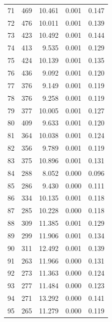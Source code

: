 \begin{table}
\begin{tabular}{rrrrr}
  71 &    469 &         10.461 &        0.001 &           0.147 \\
  72 &    476 &         10.011 &        0.001 &           0.139 \\
  73 &    423 &         10.492 &        0.001 &           0.144 \\
  74 &    413 &          9.535 &        0.001 &           0.129 \\
  75 &    424 &         10.139 &        0.001 &           0.135 \\
  76 &    436 &          9.092 &        0.001 &           0.120 \\
  77 &    376 &          9.149 &        0.001 &           0.119 \\
  78 &    376 &          9.258 &        0.001 &           0.119 \\
  79 &    377 &         10.005 &        0.001 &           0.127 \\
  80 &    409 &          9.633 &        0.001 &           0.120 \\
  81 &    364 &         10.038 &        0.001 &           0.124 \\
  82 &    356 &          9.789 &        0.001 &           0.119 \\
  83 &    375 &         10.896 &        0.001 &           0.131 \\
  84 &    288 &          8.052 &        0.000 &           0.096 \\
  85 &    286 &          9.430 &        0.000 &           0.111 \\
  86 &    334 &         10.135 &        0.001 &           0.118 \\
  87 &    285 &         10.228 &        0.000 &           0.118 \\
  88 &    309 &         11.385 &        0.001 &           0.129 \\
  89 &    299 &         11.906 &        0.001 &           0.134 \\
  90 &    311 &         12.492 &        0.001 &           0.139 \\
  91 &    263 &         11.966 &        0.000 &           0.131 \\
  92 &    273 &         11.363 &        0.000 &           0.124 \\
  93 &    277 &         11.484 &        0.000 &           0.123 \\
  94 &    271 &         13.292 &        0.000 &           0.141 \\
  95 &    265 &         11.279 &        0.000 &           0.119 \\

\end{tabular}
\end{table}
